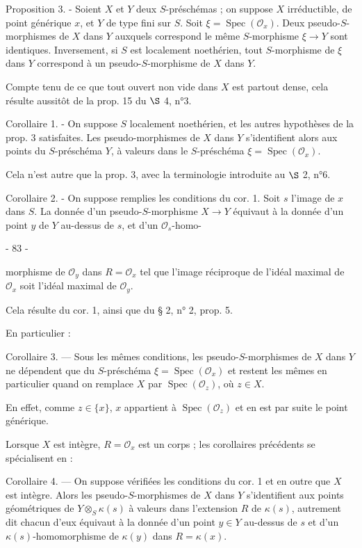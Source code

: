 Proposition 3. - Soient $X$ et $Y$ deux $S$-préschémas ; on suppose $X$ irréductible, de point générique $x$, et $Y$ de type fini sur $S$. Soit $\xi = \operatorname{Spec}(\mathcal{O}_x)$. Deux pseudo-$S$-morphismes de $X$ dans $Y$ auxquels correspond le même $S$-morphisme $\xi \to Y$ sont identiques. Inversement, si $S$ est localement noethérien, tout $S$-morphisme de $\xi$ dans $Y$ correspond à un pseudo-$S$-morphisme de $X$ dans $Y$.

Compte tenu de ce que tout ouvert non vide dans $X$ est partout dense, cela résulte aussitôt de la prop. 15 du $\S$ 4, n°3.

Corollaire 1. - On suppose $S$ localement noethérien, et les autres hypothèses de la prop. 3 satisfaites. Les pseudo-morphismes de $X$ dans $Y$ s'identifient alors aux points du $S$-préschéma $Y$, à valeurs dans le $S$-préschéma $\xi = \operatorname{Spec}(\mathcal{O}_x)$.

Cela n'est autre que la prop. 3, avec la terminologie introduite au $\S$ 2, n°6.

Corollaire 2. - On suppose remplies les conditions du cor. 1. Soit $s$ l'image de $x$ dans $S$. La donnée d'un pseudo-$S$-morphisme $X \to Y$ équivaut à la donnée d'un point $y$ de $Y$ au-dessus de $s$, et d'un $\mathcal{O}_s$-homo-

\newpage


- 83 -

morphisme de $\mathcal{O}_y$ dans $R = \mathcal{O}_x$ tel que l'image réciproque de l'idéal maximal de $\mathcal{O}_x$ soit l'idéal maximal de $\mathcal{O}_y$.

Cela résulte du cor. 1, ainsi que du § 2, n° 2, prop. 5.

En particulier :

Corollaire 3. — Sous les mêmes conditions, les pseudo-$S$-morphismes de $X$ dans $Y$ ne dépendent que du $S$-préschéma $\xi = \operatorname{Spec}(\mathcal{O}_x)$ et restent les mêmes en particulier quand on remplace $X$ par $\operatorname{Spec}(\mathcal{O}_z)$, où $z \in X$.

En effet, comme $z \in \{x\}$, $x$ appartient à $\operatorname{Spec}(\mathcal{O}_z)$ et en est par suite le point générique.

Lorsque $X$ est intègre, $R = \mathcal{O}_x$ est un corps ; les corollaires précédents se spécialisent en :

Corollaire 4. — On suppose vérifiées les conditions du cor. 1 et en outre que $X$ est intègre. Alors les pseudo-$S$-morphismes de $X$ dans $Y$ s'identifient aux points géométriques de $Y \otimes_S \kappa(s)$ à valeurs dans l'extension $R$ de $\kappa(s)$, autrement dit chacun d'eux équivaut à la donnée d'un point $y \in Y$ au-dessus de $s$ et d'un $\kappa(s)$-homomorphisme de $\kappa(y)$ dans $R = \kappa(x)$.

